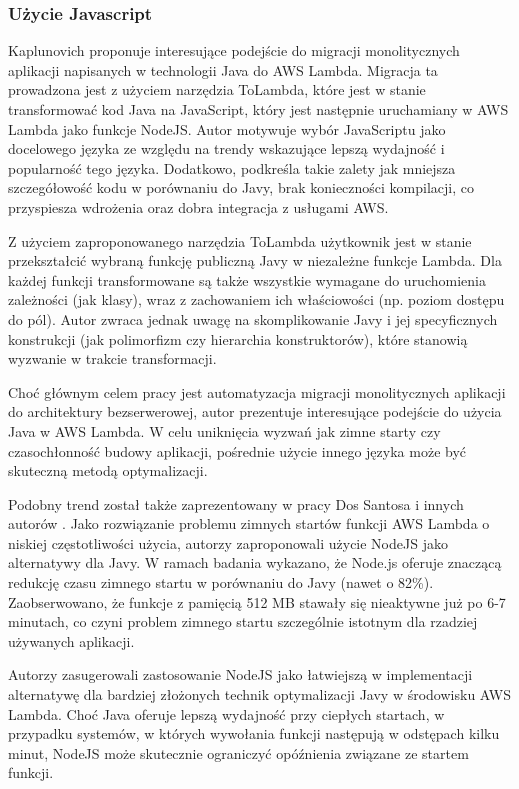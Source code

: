 \subsubsection*{Użycie Javascript}
Kaplunovich \cite{8844428} proponuje interesujące podejście do migracji monolitycznych aplikacji napisanych w technologii Java do AWS Lambda.
Migracja ta prowadzona jest z użyciem narzędzia ToLambda, które jest w stanie transformować kod Java na JavaScript, który jest następnie uruchamiany w AWS Lambda jako funkcje NodeJS.
Autor motywuje wybór JavaScriptu jako docelowego języka ze względu na trendy wskazujące lepszą wydajność i popularność tego języka.
Dodatkowo, podkreśla takie zalety jak mniejsza szczegółowość kodu w porównaniu do Javy, brak konieczności kompilacji, co przyspiesza wdrożenia oraz dobra integracja z usługami AWS.

Z użyciem zaproponowanego narzędzia ToLambda użytkownik jest w stanie przekształcić wybraną funkcję publiczną Javy w niezależne funkcje Lambda.
Dla każdej funkcji transformowane są także wszystkie wymagane do uruchomienia zależności (jak klasy), wraz z zachowaniem ich właściowości (np. poziom dostępu do pól).
Autor zwraca jednak uwagę na skomplikowanie Javy i jej specyficznych konstrukcji (jak polimorfizm czy hierarchia konstruktorów), które stanowią wyzwanie w trakcie transformacji. 

Choć głównym celem pracy jest automatyzacja migracji monolitycznych aplikacji do architektury bezserwerowej, autor prezentuje interesujące podejście do użycia Java w AWS Lambda.
W celu uniknięcia wyzwań jak zimne starty czy czasochłonność budowy aplikacji, pośrednie użycie innego języka może być skuteczną metodą optymalizacji.

Podobny trend został także zaprezentowany w pracy Dos Santosa i innych autorów \cite{FerreiraDosSantos2023}.
Jako rozwiązanie problemu zimnych startów funkcji AWS Lambda o niskiej częstotliwości użycia, autorzy zaproponowali użycie NodeJS jako alternatywy dla Javy.
W ramach badania wykazano, że Node.js oferuje znaczącą redukcję czasu zimnego startu w porównaniu do Javy (nawet o 82\%). 
Zaobserwowano, że funkcje z pamięcią 512 MB stawały się nieaktywne już po 6-7 minutach, co czyni problem zimnego startu szczególnie istotnym dla rzadziej używanych aplikacji.

Autorzy zasugerowali zastosowanie NodeJS jako łatwiejszą w implementacji alternatywę dla bardziej złożonych technik optymalizacji Javy w środowisku AWS Lambda. 
Choć Java oferuje lepszą wydajność przy ciepłych startach, w przypadku systemów, w których wywołania funkcji następują w odstępach kilku minut, NodeJS może skutecznie ograniczyć opóźnienia związane ze startem funkcji.

